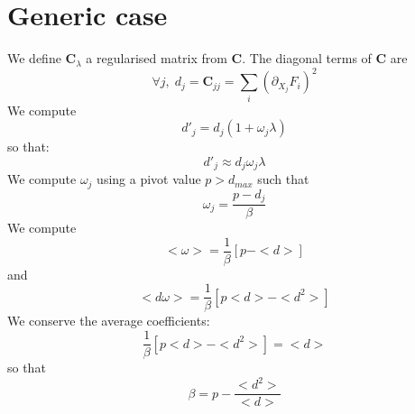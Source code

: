 \documentclass[aps,12pt]{revtex4}
\begin{document}
\section{Generic case}
We define $\bm{C}_\lambda$ a regularised matrix from $\bm{C}$.
The diagonal terms of $\bm{C}$ are
\begin{equation}
	\forall j, \; d_j = \bm{C}_{jj} = \sum_i \left(\partial_{X_j} F_i\right)^2
\end{equation}
We compute
\begin{equation}
	d'_j = d_j (1+\omega_j \lambda)
\end{equation}
so that:
\begin{equation}
	d'_j \approx d_j \omega_j \lambda
\end{equation}
We compute $\omega_j$ using a pivot value $p>d_{max}$ such that
\begin{equation}
	\omega_j = \dfrac{p-d_j}{\beta}
\end{equation}
 We compute
\begin{equation}
	<\omega> = \dfrac{1}{\beta}\left[p-<d>\right]
\end{equation}
and
\begin{equation}
	<d\omega> = \dfrac{1}{\beta} \left[ p <d> - <d^2>\right]
\end{equation}
We conserve the average coefficients:
\begin{equation}
	\dfrac{1}{\beta} \left[ p <d> - <d^2>\right] = <d>
\end{equation}
 so that
 \begin{equation}
 	\beta = p - \dfrac{<d^2>}{<d>}
 \end{equation}
 
 
\end{document}
